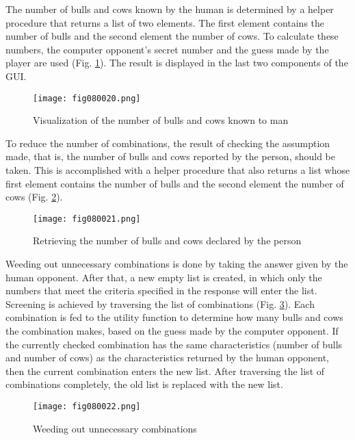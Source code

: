 The number of bulls and cows known by the human is determined by a helper procedure that returns a list of two elements. The first element contains the number of bulls and the second element the number of cows. To calculate these numbers, the computer opponent's secret number and the guess made by the player are used (Fig. \ref{fig080020}). The result is displayed in the last two components of the GUI.

\begin{figure}[H]
   \centering
   \texttt{[image: fig080020.png]}
   \caption{Visualization of the number of bulls and cows known to man}
\label{fig080020}
\end{figure}

To reduce the number of combinations, the result of checking the assumption made, that is, the number of bulls and cows reported by the person, should be taken. This is accomplished with a helper procedure that also returns a list whose first element contains the number of bulls and the second element the number of cows (Fig. \ref{fig080021}).

\begin{figure}[H]
   \centering
   \texttt{[image: fig080021.png]}
   \caption{Retrieving the number of bulls and cows declared by the person}
\label{fig080021}
\end{figure}

Weeding out unnecessary combinations is done by taking the answer given by the human opponent. After that, a new empty list is created, in which only the numbers that meet the criteria specified in the response will enter the list. Screening is achieved by traversing the list of combinations (Fig. \ref{fig080022}). Each combination is fed to the utility function to determine how many bulls and cows the combination makes, based on the guess made by the computer opponent. If the currently checked combination has the same characteristics (number of bulls and number of cows) as the characteristics returned by the human opponent, then the current combination enters the new list. After traversing the list of combinations completely, the old list is replaced with the new list.

\begin{figure}[H]
   \centering
   \texttt{[image: fig080022.png]}
   \caption{Weeding out unnecessary combinations}
\label{fig080022}
\end{figure}

